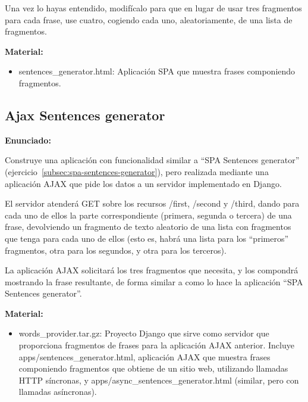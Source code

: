 Una vez lo hayas entendido, modifícalo para que en lugar de usar tres fragmentos para cada frase, use cuatro, cogiendo cada uno, aleatoriamente, de una lista de fragmentos.

\textbf{Material:}
\begin{itemize}
\item sentences\_generator.html: Aplicación SPA que muestra frases componiendo fragmentos.
\end{itemize}

\subsection{Ajax Sentences generator}
\label{subsec:ajax-sentences-generator}

\textbf{Enunciado:}

Construye una aplicación con funcionalidad similar a ``SPA Sentences generator'' (ejercicio~\ref{subsec:spa-sentences-generator}), pero realizada mediante una aplicación AJAX que pide los datos a un servidor implementado en Django.

El servidor atenderá GET sobre los recursos /first, /second y /third, dando para cada uno de ellos la parte correspondiente (primera, segunda o tercera) de una frase, devolviendo un fragmento de texto aleatorio de una lista con fragmentos que tenga para cada uno de ellos (esto es, habrá una lista para los ``primeros'' fragmentos, otra para los segundos, y otra para los terceros).

La aplicación AJAX solicitará los tres fragmentos que necesita, y los compondrá mostrando la frase resultante, de forma similar a como lo hace la aplicación ``SPA Sentences generator''.

\textbf{Material:}

\begin{itemize}
\item words\_provider.tar.gz: Proyecto Django que sirve como servidor que proporciona fragmentos de frases para la aplicación AJAX anterior. Incluye apps/sentences\_generator.html, aplicación AJAX que muestra frases componiendo fragmentos que obtiene de un sitio web, utilizando llamadas HTTP síncronas, y apps/async\_sentences\_generator.html (similar, pero con llamadas asíncronas).
\end{itemize}

